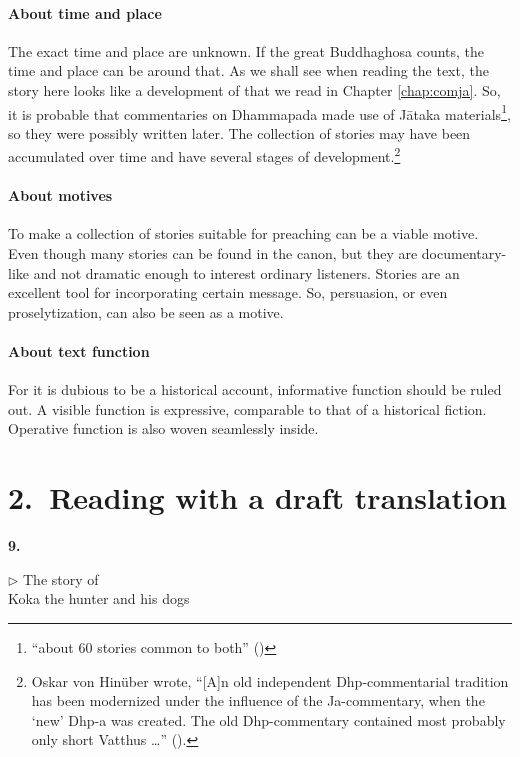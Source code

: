 \paragraph*{About time and place} The exact time and place are unknown. If the great Buddhaghosa counts, the time and place can be around that. As we shall see when reading the text, the story here looks like a development of that we read in Chapter \ref{chap:comja}. So, it is probable that commentaries on Dhammapada made use of J\=ataka materials\footnote{``about 60 stories common to both'' (\citealp[p.~133]{hinuber:literature})}, so they were possibly written later. The collection of stories may have been accumulated over time and have several stages of development.\footnote{Oskar von Hin\"uber wrote, ``[A]n old independent Dhp-commentarial tradition has been modernized under the influence of the Ja-commentary, when the `new' Dhp-a was created. The old Dhp-commentary contained most probably only short Vatthus \ldots'' (\citealp[p.~134]{hinuber:literature}).}

\paragraph*{About motives} To make a collection of stories suitable for preaching can be a viable motive. Even though many stories can be found in the canon, but they are documentary-like and not dramatic enough to interest ordinary listeners. Stories are an excellent tool for incorporating certain message. So, persuasion, or even proselytization, can also be seen as a motive. 

\paragraph*{About text function} For it is dubious to be a historical account, informative function should be ruled out. A visible function is expressive, comparable to that of a historical fiction. Operative function is also woven seamlessly inside.

{}
\section*{2.\ Reading with a draft translation}

\begin{center}
\textbf{9. }\par
$\triangleright$ The story of\\Koka the hunter and his dogs
\end{center}

